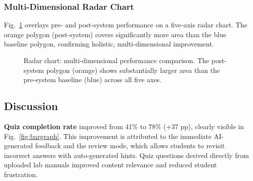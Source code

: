 \documentclass[conference]{IEEEtran}
\begin{document}
\begin{table}[h]
\subsubsection{Multi-Dimensional Radar Chart}

Fig.~\ref{fig:radar} overlays pre- and post-system performance on a five-axis radar chart. The orange polygon (post-system) covers significantly more area than the blue baseline polygon, confirming holistic, multi-dimensional improvement.

\begin{figure}[h]
\centering
{}
\caption{Radar chart: multi-dimensional performance comparison. The post-system polygon (orange) shows substantially larger area than the pre-system baseline (blue) across all five axes.}
\label{fig:radar}
\end{figure}

\subsection{Discussion}

\textbf{Quiz completion rate} improved from 41\% to 78\% ($+$37 pp), clearly visible in Fig.~\ref{fig:bargraph}. This improvement is attributed to the immediate AI-generated feedback and the review mode, which allows students to revisit incorrect answers with auto-generated hints. Quiz questions derived directly from uploaded lab manuals improved content relevance and reduced student frustration.


\end{table}
\end{document}
